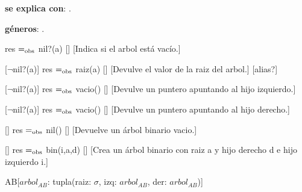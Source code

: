 \begin{Interfaz}
  
  
  \textbf{se explica con}: .
  
  \textbf{g\'eneros}: .


  {res $=_{\mathrm{obs}}$ nil?(a)}
  []
  [Indica si el arbol est\'a vac\'io.]

  [$\neg$nil?(a)]
  {res $=_{\mathrm{obs}}$ raiz(a)}
  []
  [Devulve el valor de la raiz del arbol.]
  [alias?]
  
  [$\neg$nil?(a)]  
  {res $=_{\mathrm{obs}}$ vacio()}
  []
  [Devulve un puntero apuntando al hijo izquierdo.]
  
  [$\neg$nil?(a)]  
  {res $=_{\mathrm{obs}}$ vacio()}
  []
  [Devulve un puntero apuntando al hijo derecho.]
  
  []
  {res $=_{\mathrm{obs}}$ nil()}
  []
  [Devuelve un \'arbol binario vacio.]
  
  []
  {res $=_{\mathrm{obs}}$ bin(i,a,d)}
  []
  [Crea un \'arbol binario con raiz a y hijo derecho d e hijo izquierdo i.]

\end{Interfaz}

\newpage 

\begin{Representacion}

\begin{Estructura}{AB}[$arbol_{AB}$: tupla(raiz: $\sigma$, izq: $arbol_{AB}$, der: $arbol_{AB}$)]
   
\end{Estructura}

\end{Representacion}

\newpage

